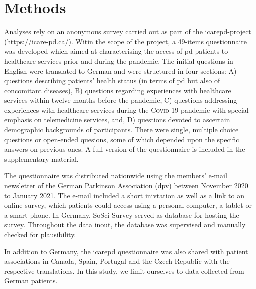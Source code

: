 \documentclass{bmcart}
\begin{document}
\section*{Methods}
Analyses rely on an anonymous survey carried out as part of the \ac{icarepd}-project (\url{https://icare-pd.ca/}). Witin the scope of the project, a 49-items questionnaire was developed which aimed at characterising the access of \ac{pd}-patients to healthcare services prior and during the pandemic. The initial questions in English were translated to German and were structured in four sections: A) questions describing patients' health status (in terms of \ac{pd} but also of concomitant diseases), B) questions regarding experiences with healthcare services within twelve months before the pandemic, C) questions addressing experiences with healthcare services during the \textsc{Covid}-19 pandemic with special emphasis on telemedicine services, and, D) questions devoted to ascertain demographic backgrounds of participants. There were single, multiple choice questions or open-ended quesions, some of which depended upon the specific answers on previous ones. A full version of the questionnaire is included in the supplementary material. 

The questionnaire was distributed nationwide using the members’ e-mail newsletter of the German Parkinson Association (\ac{dpv}) between November 2020 to January 2021. The e-mail included a short inivtation as well as a link to an online survey, which patients could access using a personal computer, a tablet or a smart phone. In Germany, SoSci Survey \cite{leiner2016} served as database for hosting the survey. Throughout the data inout, the database was supervised and manually checked for plausibility. 

In addition to Germany, the \ac{icarepd} questionnaire was also shared with patient associations in Canada, Spain, Portugal and the Czech Republic with the respective translations. In this study, we limit ourselves to data collected from German patients. 

\end{document}
